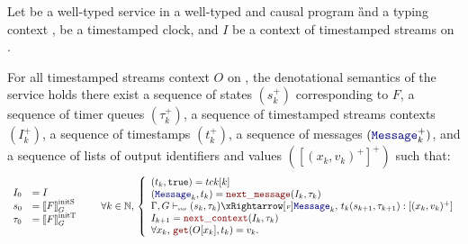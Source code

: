 \begin{theorem}[Equivalence]\label{thm:semantics:grfrp:theorems:equivalence}
    Let  be a well-typed service in a well-typed and causal program \G and a
    typing context \tyCtx, \tck be a timestamped clock, and $I$ be a context of timestamped
    streams on \tck.

    For all timestamped streams context $O$ on \tck, the denotational semantics of the service
     holds \iff there exist a sequence of states $(s_k^+)$
    corresponding to $F$, a sequence of timer queues $(\tau_k^+)$, a sequence of timestamped streams
    contexts $(I_k^+)$, a sequence of timestamps $(t_k^+)$, a sequence of messages $(\mess_k^+)$, and
    a sequence of lists of output identifiers and values $([(x_k, v_k)^+]^+)$ such that:
    \begin{equation*}
        \begin{array}{ll}
            I_0    & = I             \\
            s_0    & = \initstate{F} \\
            \tau_0 & = \inittimer{F} \\
        \end{array} \qquad
        \forall k \in \N, \,
        \left\{
        \begin{array}{ll}
            (t_k, \true) = \tck[k]                                                         \\
            (\mess_k, t_k) = \nextMess{I_k}{\tau_k}                                        \\
            \serviceOpSem{s_k}{\tau_k}{F}{\mess_k}{t_k}{s_{k+1}}{\tau_{k+1}}{(x_k, v_k)^+} \\
            I_{k+1} = \nextContext{I_k}{\tau_k}                                            \\
            \forall x_k, \, \getAt{O[x_k]}{t_k}=v_k.
        \end{array}
        \right.
    \end{equation*}
\end{theorem}
